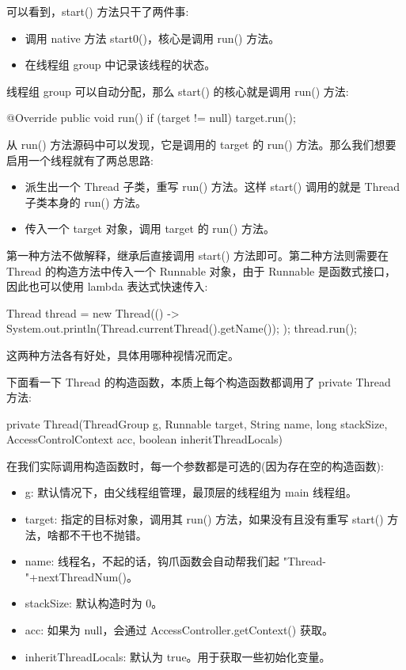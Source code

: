 可以看到，start() 方法只干了两件事:
\begin{itemize}
    \item 调用 native 方法 start0()，核心是调用 run() 方法。
    \item 在线程组 group 中记录该线程的状态。
\end{itemize}

线程组 group 可以自动分配，那么 start() 的核心就是调用 run() 方法:

\begin{Java}
@Override
public void run() {
    if (target != null) {
        target.run();
    }
}
\end{Java}

从 run() 方法源码中可以发现，它是调用的 target 的 run() 方法。那么我们想要启用一个线程就有了两总思路:

\begin{itemize}
    \item 派生出一个 Thread 子类，重写 run() 方法。这样 start() 调用的就是 Thread 子类本身的 run() 方法。
    \item 传入一个 target 对象，调用 target 的 run() 方法。
\end{itemize}

第一种方法不做解释，继承后直接调用 start() 方法即可。第二种方法则需要在 Thread 的构造方法中传入一个 Runnable 对象，由于 Runnable 是函数式接口，因此也可以使用 lambda 表达式快速传入:

\begin{Java}
Thread thread = new Thread(() -> {
    System.out.println(Thread.currentThread().getName());
});
thread.run();
\end{Java}

这两种方法各有好处，具体用哪种视情况而定。

下面看一下 Thread 的构造函数，本质上每个构造函数都调用了 private Thread 方法:

\begin{Java}
private Thread(ThreadGroup g, Runnable target, String name, long stackSize, AccessControlContext acc, boolean inheritThreadLocals)
\end{Java}

在我们实际调用构造函数时，每一个参数都是可选的(因为存在空的构造函数):
\begin{itemize}
    \item g: 默认情况下，由父线程组管理，最顶层的线程组为 main 线程组。
    \item target: 指定的目标对象，调用其 run() 方法，如果没有且没有重写 start() 方法，啥都不干也不抛错。
    \item name: 线程名，不起的话，钩爪函数会自动帮我们起 "Thread-"+nextThreadNum()。
    \item stackSize: 默认构造时为 0。
    \item acc: 如果为 null，会通过 AccessController.getContext() 获取。
    \item inheritThreadLocals: 默认为 true。用于获取一些初始化变量。
\end{itemize}

